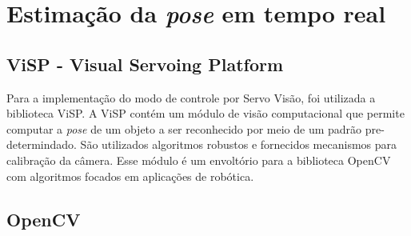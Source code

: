 \chapter{Estimação da \textit{pose} em tempo real} 
 
\section{ViSP - Visual Servoing Platform}

Para a implementação do modo de controle por Servo Visão, foi utilizada a biblioteca ViSP. A ViSP contém um módulo de visão computacional que permite computar a \textit{pose} de um objeto a ser reconhecido por meio de um padrão pre-determindado. São utilizados algoritmos robustos e fornecidos mecanismos para calibração da câmera. Esse módulo é um envoltório para a biblioteca OpenCV com algoritmos focados em aplicações de robótica.

\section{OpenCV}
